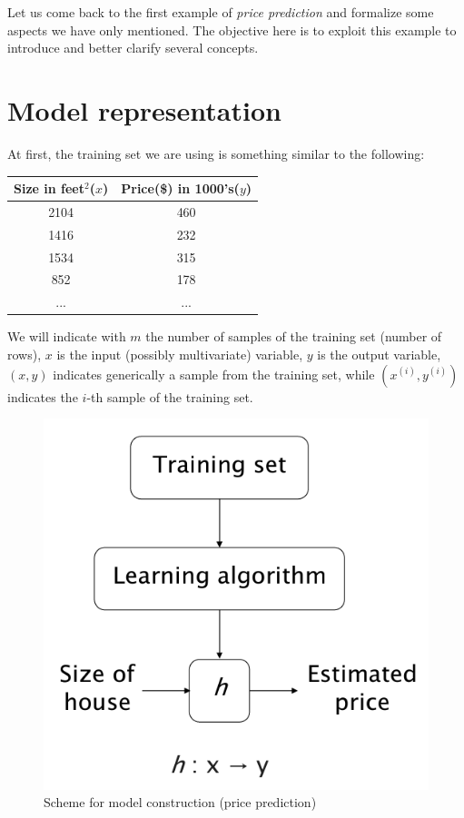 Let us come back to the first example of \textit{price prediction} and formalize some aspects we have only mentioned. The objective here is to exploit this example to introduce and better clarify several concepts.\\
\section{Model representation}
At first, the training set we are using is something similar to the following:

\begin{table}[h]
    \centering
    \begin{tabular}{c c}
        \textbf{Size in feet$^2$($x$)}&\textbf{Price(\$) in 1000's($y$)}\\
        \hline
        2104&460\\
        1416&232\\
        1534&315\\
        852&178\\
        ...&...
    \end{tabular}
\end{table}
\noindent
We will indicate with $m$ the number of samples of the training set (number of rows), $x$ is the input (possibly multivariate) variable, $y$ is the output variable, $(x,y)$ indicates generically a sample from the training set, while $(x^{(i)}, y^{(i)})$ indicates the $i$-th sample of the training set.

\begin{figure}[h]
    \centering
    \label{}
    \includegraphics[scale=0.5]{img/model.png}
    \caption{Scheme for model construction (price prediction)}
\end{figure}

